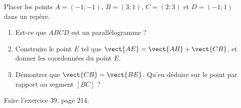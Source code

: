 
\begin{exercice}\label{exosmath-0591}

    Placer les points \( A=(-1;-1)\), \( B=(3;1)\), \( C=(2;3)\) et \( D=(-1;1)\) dans un repère.
    \begin{enumerate}
        \item
            Est-ce que \( ABCD\) est un parallélogramme ?
        \item
            Construire le point \( E\) tel que \( \vect{ AE }=\vect{ AB }+\vect{ CB }\), et donner les coordonnées du point \( E\).
        \item
            Démontrer que \( \vect{ CB }=\vect{ BE } \). Qu'en déduire sur le point par rapport au segment \( [BC]\) ?
    \end{enumerate}

    Faire l'exercice 39, page 214.

\end{exercice}
